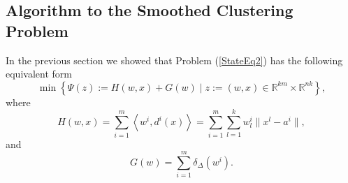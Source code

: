 \documentclass[11pt]{article}
\numberwithin{equation}{section}
\begin{document}
%


\subsection{Algorithm to the Smoothed Clustering Problem}

In the previous section we showed that Problem (\ref{StateEq2}) has the following equivalent form
\begin{equation*}
	\min \left\lbrace \Psi(z) := H(w,x) + G(w) \mid z := (w,x) \in \mathbb{R}^{km} \times \mathbb{R}^{nk} \right\rbrace ,
\end{equation*}
where 
\begin{equation*}
	H(w,x) = \sum\limits_{i=1}^{m} \left\langle w^i , d^i(x) \right\rangle
	= \sum\limits_{i=1}^{m} \sum\limits_{l=1}^{k} w^i_l \| x^l - a^i \| ,
\end{equation*}
and 
\begin{equation*}
G(w) = \sum\limits_{i=1}^{m} \delta_{\Delta}(w^i) .
\end{equation*}
\end{document}
